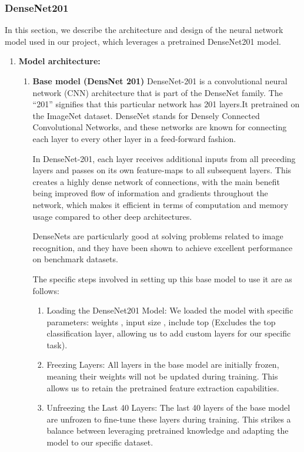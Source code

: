 \subsubsection{DenseNet201}
In this section, we describe the architecture and design of the neural network model used in our project, which leverages a pretrained DenseNet201 model.
\begin{enumerate}

    \item \textbf{Model architecture:}
    
    \begin{enumerate}
    \item \textbf{Base model (DensNet 201)}
    DenseNet-201 is a convolutional neural network (CNN) architecture that is part of the DenseNet family. The “201” signifies that this particular network has 201 layers.It pretrained on the ImageNet dataset. DenseNet stands for Densely Connected Convolutional Networks, and these networks are known for connecting each layer to every other layer in a feed-forward fashion.
    
    In DenseNet-201, each layer receives additional inputs from all preceding layers and passes on its own feature-maps to all subsequent layers. This creates a highly dense network of connections, with the main benefit being improved flow of information and gradients throughout the network, which makes it efficient in terms of computation and memory usage compared to other deep architectures.
    
    DenseNets are particularly good at solving problems related to image recognition, and they have been shown to achieve excellent performance on benchmark datasets.
    
    The specific steps involved in setting up this base model to use it are as follows:
        \begin{enumerate}
        \item {Loading the DenseNet201 Model:} We loaded the model with specific parameters: weights , input size , include top (Excludes the top classification layer, allowing us to add custom layers for our specific task).

        \item {Freezing Layers:} All layers in the base model are initially frozen, meaning their weights will not be updated during training. This allows us to retain the pretrained feature extraction capabilities.

        \item {Unfreezing the Last 40 Layers:} The last 40 layers of the base model are unfrozen to fine-tune these layers during training. This strikes a balance between leveraging pretrained knowledge and adapting the model to our specific dataset.
        \end{enumerate}


\end{enumerate}
\end{enumerate}
